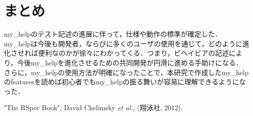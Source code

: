 \documentclass[10pt,a4j,twocolumn]{jsarticle}
\begin{document}
\section{まとめ}
\vspace{-0.5em}
my\_helpのテスト記述の進展に伴って，仕様や動作の標準が確定した．
my\_helpは今後も開発者，ならびに多くのユーザの使用を通じて，どのように進化させれば便利なのかが徐々にわかってくる．つまり，ビヘイビアの記述により，今後my\_helpを進化させるための共同開発が円滑に進める手助けになる．
さらに，my\_helpの使用方法が明確になったことで，本研究で作成したmy\_helpのfeaturesを読めば初心者でもmy\_helpの振る舞いが容易に理解できるようになった．

\begin{thebibliography}{99}
   "The RSpec Book", David Chelimsky {\it et al.}, (翔泳社, 2012).
\end{thebibliography}
\end{document}
